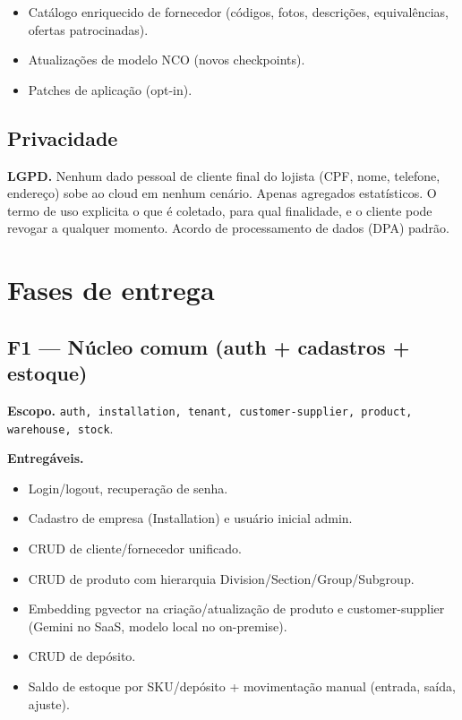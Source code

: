 \documentclass[11pt,a4paper]{article}
\begin{document}
\begin{itemize}[leftmargin=2em]
  \item Catálogo enriquecido de fornecedor (códigos, fotos, descrições,
        equivalências, ofertas patrocinadas).
  \item Atualizações de modelo NCO (novos checkpoints).
  \item Patches de aplicação (opt-in).
\end{itemize}

\subsection{Privacidade}

\begin{cuidado}
\textbf{LGPD.} Nenhum dado pessoal de cliente final do lojista
(CPF, nome, telefone, endereço) sobe ao cloud em nenhum cenário. Apenas
agregados estatísticos. O termo de uso explicita o que é coletado,
para qual finalidade, e o cliente pode revogar a qualquer momento.
Acordo de processamento de dados (DPA) padrão.
\end{cuidado}

\section{Fases de entrega}

\subsection{F1 --- Núcleo comum (auth + cadastros + estoque)}

\textbf{Escopo.} \texttt{auth, installation, tenant, customer-supplier,
product, warehouse, stock}.

\textbf{Entregáveis.}
\begin{itemize}[leftmargin=2em]
  \item Login/logout, recuperação de senha.
  \item Cadastro de empresa (Installation) e usuário inicial admin.
  \item CRUD de cliente/fornecedor unificado.
  \item CRUD de produto com hierarquia Division/Section/Group/Subgroup.
  \item Embedding pgvector na criação/atualização de produto e
        customer-supplier (Gemini no SaaS, modelo local no on-premise).
  \item CRUD de depósito.
  \item Saldo de estoque por SKU/depósito + movimentação manual (entrada,
        saída, ajuste).
\end{itemize}
\end{document}
